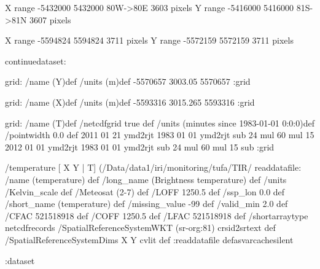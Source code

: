 X range -5432000 5432000  80W->80E 3603 pixels
Y range -5416000 5416000  81S->81N 3607 pixels

X range -5594824 5594824  3711 pixels
Y range -5572159 5572159  3711 pixels


\begin{ingrid}
continuedataset:

grid:
/name (Y)def
/units (m)def
 -5570657 3003.05 5570657
:grid

grid:
/name (X)def
/units (m)def
 -5593316 3015.265 5593316
:grid

grid:
/name (T)def
/netcdfgrid true def
/units (minutes since 1983-01-01 0:0:0)def
/pointwidth 0.0 def
2011 01 21 ymd2rjt 1983 01 01 ymd2rjt sub 24 mul 60 mul
15
2012 01 01 ymd2rjt 1983 01 01 ymd2rjt sub 24 mul 60 mul 15 sub
:grid

/temperature{
[ X Y | T] (/Data/data1/iri/monitoring/tufa/TIR/%
readdatafile:
/name (temperature) def
/long_name (Brightness temperature) def
/units /Kelvin_scale def
/Meteosat (2-7) def
/LOFF 1250.5 def
/ssp_lon 0.0 def
/short_name (temperature) def
/missing_value -99 def
/valid_min 2.0 def
/CFAC 521518918 def
/COFF 1250.5 def
/LFAC 521518918 def
/shortarraytype netcdfrecords
/SpatialReferenceSystemWKT (sr-org:81) crsid2srtext def
/SpatialReferenceSystemDims { X Y } cvlit  def
:readdatafile
}defasvarcachesilent

:dataset

\end{ingrid}
